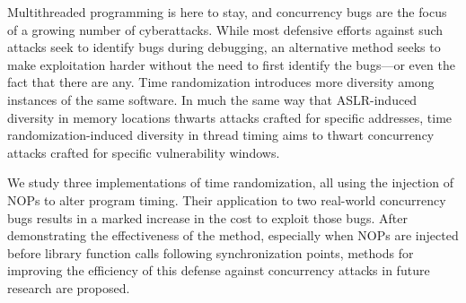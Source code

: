 Multithreaded programming is here to stay, and concurrency bugs are the focus of a growing number of cyberattacks.
While most defensive efforts against such attacks seek to identify bugs during
debugging, an alternative method seeks to make exploitation harder without the
need to first identify the bugs---or even the fact that there are any.
Time randomization introduces more diversity among instances of the same software.
In much the same way that ASLR-induced diversity in memory locations thwarts attacks crafted for specific addresses, time randomization-induced diversity in thread timing aims to thwart concurrency attacks crafted for specific vulnerability windows.

We study three implementations of time randomization, all using the injection of NOPs to alter program timing.
Their application to two real-world concurrency bugs results in a marked increase in the cost to exploit those bugs.
After demonstrating the effectiveness of the method, especially when NOPs are injected before library function calls following synchronization points, methods for improving the efficiency of this defense against concurrency attacks in future research are proposed.
